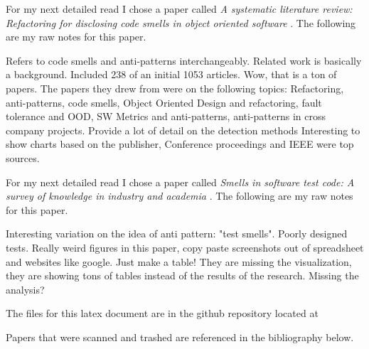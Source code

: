 \documentclass[conference]{IEEEtran}
\begin{document}
For my next detailed read I chose a paper called  \textit{A systematic literature review: Refactoring for disclosing code smells in object oriented software} \cite{singh_systematic_2018}. 
The following are my raw notes for this paper.

Refers to code smells and anti-patterns interchangeably.
Related work is basically a background.
Included 238 of an initial 1053 articles.
Wow, that is a ton of papers.
The papers they drew from were on the following topics: Refactoring, anti-patterns, code smells, Object Oriented Design and refactoring, fault tolerance and OOD, SW Metrics and anti-patterns, anti-patterns in cross company projects.
Provide a lot of detail on the detection methods
Interesting to show charts based on the publisher, Conference proceedings and IEEE were top sources.


For my next detailed read I chose a paper called  \textit{Smells in software test code: A survey of knowledge in industry and academia} \cite{garousi_smells_2018}. 
The following are my raw notes for this paper.

Interesting variation on the idea of anti pattern: "test smells".
Poorly designed tests.
Really weird figures in this paper, copy paste screenshots out of spreadsheet and websites like google.
Just make a table!
They are missing the visualization, they are showing tons of tables instead of the results of the research.
Missing the analysis?


The files for this latex document are in the github repository located at 

Papers that were scanned and trashed are referenced in the bibliography below. 
\nocite{*}
\clearpage




\end{document}
